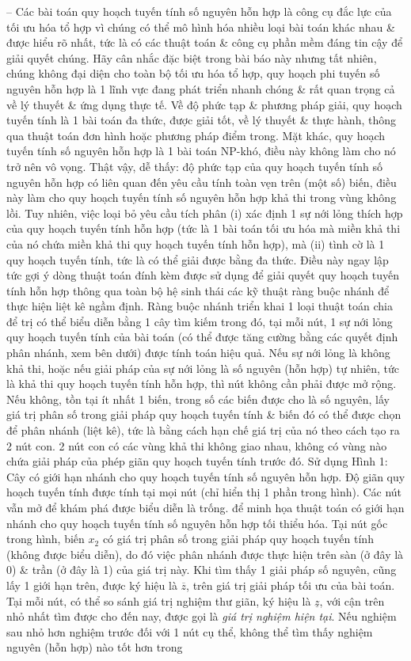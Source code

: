 \documentclass{article}
\begin{document}
\begin{itemize}
\begin{itemize}
        -- Các bài toán quy hoạch tuyến tính số nguyên hỗn hợp là công cụ đắc lực của tối ưu hóa tổ hợp vì chúng có thể mô hình hóa nhiều loại bài toán khác nhau \& được hiểu rõ nhất, tức là có các thuật toán \& công cụ phần mềm đáng tin cậy để giải quyết chúng. Hãy cân nhắc đặc biệt trong bài báo này nhưng tất nhiên, chúng không đại diện cho toàn bộ tối ưu hóa tổ hợp, quy hoạch phi tuyến số nguyên hỗn hợp là 1 lĩnh vực đang phát triển nhanh chóng \& rất quan trọng cả về lý thuyết \& ứng dụng thực tế. Về độ phức tạp \& phương pháp giải, quy hoạch tuyến tính là 1 bài toán đa thức, được giải tốt, về lý thuyết \& thực hành, thông qua thuật toán đơn hình hoặc phương pháp điểm trong. Mặt khác, quy hoạch tuyến tính số nguyên hỗn hợp là 1 bài toán NP-khó, điều này không làm cho nó trở nên vô vọng. Thật vậy, dễ thấy: độ phức tạp của quy hoạch tuyến tính số nguyên hỗn hợp có liên quan đến yêu cầu tính toàn vẹn trên (một số) biến, điều này làm cho quy hoạch tuyến tính số nguyên hỗn hợp khả thi trong vùng không lồi. Tuy nhiên, việc loại bỏ yêu cầu tích phân (i) xác định 1 sự nới lỏng thích hợp của quy hoạch tuyến tính hỗn hợp (tức là 1 bài toán tối ưu hóa mà miền khả thi của nó chứa miền khả thi quy hoạch tuyến tính hỗn hợp), mà (ii) tình cờ là 1 quy hoạch tuyến tính, tức là có thể giải được bằng đa thức. Điều này ngay lập tức gợi ý dòng thuật toán đính kèm được sử dụng để giải quyết quy hoạch tuyến tính hỗn hợp thông qua toàn bộ hệ sinh thái các kỹ thuật ràng buộc nhánh để thực hiện liệt kê ngầm định. Ràng buộc nhánh triển khai 1 loại thuật toán chia để trị có thể biểu diễn bằng 1 cây tìm kiếm trong đó, tại mỗi nút, 1 sự nới lỏng quy hoạch tuyến tính của bài toán (có thể được tăng cường bằng các quyết định phân nhánh, xem bên dưới) được tính toán hiệu quả. Nếu sự nới lỏng là không khả thi, hoặc nếu giải pháp của sự nới lỏng là số nguyên (hỗn hợp) tự nhiên, tức là khả thi quy hoạch tuyến tính hỗn hợp, thì nút không cần phải được mở rộng. Nếu không, tồn tại ít nhất 1 biến, trong số các biến được cho là số nguyên, lấy giá trị phân số trong giải pháp quy hoạch tuyến tính \& biến đó có thể được chọn để phân nhánh (liệt kê), tức là bằng cách hạn chế giá trị của nó theo cách tạo ra 2 nút con. 2 nút con có các vùng khả thi không giao nhau, không có vùng nào chứa giải pháp của phép giãn quy hoạch tuyến tính trước đó. Sử dụng {\sf Hình 1: Cây có giới hạn nhánh cho quy hoạch tuyến tính số nguyên hỗn hợp. Độ giãn quy hoạch tuyến tính được tính tại mọi nút (chỉ hiển thị 1 phần trong hình). Các nút vẫn mở để khám phá được biểu diễn là trống.} để minh họa thuật toán có giới hạn nhánh cho quy hoạch tuyến tính số nguyên hỗn hợp tối thiểu hóa. Tại nút gốc trong hình, biến $x_2$ có giá trị phân số trong giải pháp quy hoạch tuyến tính (không được biểu diễn), do đó việc phân nhánh được thực hiện trên sàn (ở đây là 0) \& trần (ở đây là 1) của giá trị này. Khi tìm thấy 1 giải pháp số nguyên, cũng lấy 1 giới hạn trên, được ký hiệu là $\overline{z}$, trên giá trị giải pháp tối ưu của bài toán. Tại mỗi nút, có thể so sánh giá trị nghiệm thư giãn, ký hiệu là $\underline{z}$, với cận trên nhỏ nhất tìm được cho đến nay, được gọi là {\it giá trị nghiệm hiện tại}. Nếu nghiệm sau nhỏ hơn nghiệm trước đối với 1 nút cụ thể, không thể tìm thấy nghiệm nguyên (hỗn hợp) nào tốt hơn trong 
\end{itemize}
\end{itemize}
\end{document}
